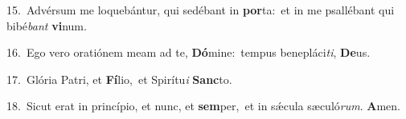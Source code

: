 {\numbfont\textcolor{\numbcolor}{15.}}~Advérsum me loquebántur, qui sedébant in \textbf{por}\-ta:~\star et in me psallébant qui bibé\textit{bant} \textbf{vi}\-num.\par
{\numbfont\textcolor{\numbcolor}{16.}}~Ego vero oratiónem meam ad te, \textbf{Dó}\-mine:~\star tempus benepláci\-\textit{ti}\-, \textbf{De}\-us.\par
{\numbfont\textcolor{\numbcolor}{17.}}~Glória Patri, et \textbf{Fí}\-lio,~\star et Spirítu\textit{i} \textbf{Sanc}\-to.\par
{\numbfont\textcolor{\numbcolor}{18.}}~Sicut erat in princípio, et nunc, et \textbf{sem}\-per,~\star et in sǽcula sæculó\-\textit{rum}\-. \textbf{A}\-men.\par
